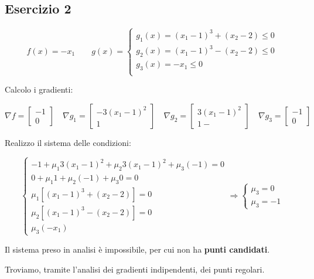 \documentclass[\main/main.tex]{subfiles}
\begin{document}
\subsection{Esercizio 2}

\begin{center}
\end{center}


\[
	f(x) = -x_1 \qquad g(x) = \begin{cases}
		g_1(x) = (x_1-1)^3 + (x_2-2) \leq 0\\
		g_2(x) = (x_1-1)^3 - (x_2-2) \leq 0\\
		g_3(x) = -x_1\leq 0\\
	\end{cases}
\]

Calcolo i gradienti:

\[
	\nabla f = \begin{bmatrix}
	-1\\
	0
	\end{bmatrix}
	\quad
	\nabla g_1 = \begin{bmatrix}
	-3(x_1-1)^2\\
	1
	\end{bmatrix}
	\quad
	\nabla g_2 = \begin{bmatrix}
	3(x_1-1)^2\\
	1-
	\end{bmatrix}
	\quad
	\nabla g_3 = \begin{bmatrix}
	-1\\
	0
	\end{bmatrix}
\]

Realizzo il sistema delle condizioni:

\[
	\begin{cases}
		-1 + \mu_1 3(x_1 -1)^2 + \mu_2 3(x_1-1)^2 + \mu_3(-1) = 0\\
		0 + \mu_1 1 + \mu_2 (-1) + \mu_3 0 = 0 \\
		\mu_1 [(x_1 - 1)^3 + (x_2-2)] = 0 \\
		\mu_2 [(x_1 - 1)^3 - (x_2-2)] = 0 \\
		\mu_3 (-x_1)
	\end{cases}
	\Rightarrow
	\begin{cases}
		\mu_3 = 0\\
		\mu_3 = -1
	\end{cases}
\]

Il sistema preso in analisi è impossibile, per cui non ha \textbf{punti candidati}.

Troviamo, tramite l'analisi dei gradienti indipendenti, dei punti regolari.
\end{document}
